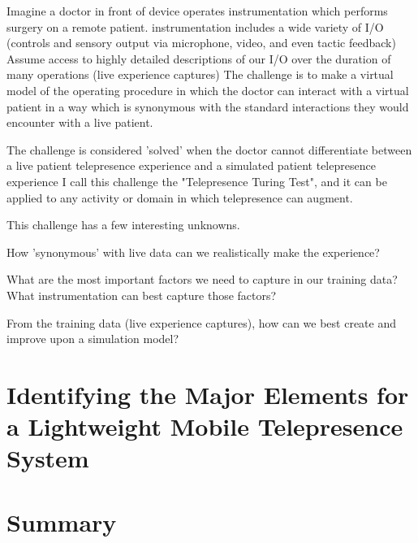 \documentclass[a4paper,12pt]{report}
\begin{document}
Imagine a doctor in front of device operates instrumentation which performs surgery on a remote patient.
instrumentation includes a wide variety of I/O (controls and sensory output via microphone, video, and even tactic feedback)
Assume access to highly detailed descriptions of our I/O over the duration of many operations (live experience captures)
The challenge is to make a virtual model of the operating procedure in which the doctor can interact with a virtual patient in a way which is synonymous with the standard interactions they would encounter with a live patient.

The challenge is considered 'solved' when the doctor cannot differentiate between a live patient telepresence experience and a simulated patient telepresence experience
I call this challenge the "Telepresence Turing Test", and it can be applied to any activity or domain in which telepresence can augment.

This challenge has a few interesting unknowns.

How 'synonymous' with live data can we realistically make the experience?

What are the most important factors we need to capture in our training data? What instrumentation can best capture those factors?

From the training data (live experience captures), how can we best create and improve upon a simulation model?\cite{391769} 

\section{Identifying the Major Elements for a Lightweight Mobile Telepresence System}
\section{Summary}


\end{document}
